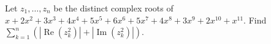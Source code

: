Let $z_1,\ldots,z_n$ be the distinct complex roots of $x+2x^2+3x^3+4x^4+5x^5+6x^6+5x^7+4x^8+3x^9+2x^{10}+x^{11}$. Find $\sum_{k=1}^n(|\operatorname{Re}(z_k^2)|+|\operatorname{Im}(z_k^2)|)$.
